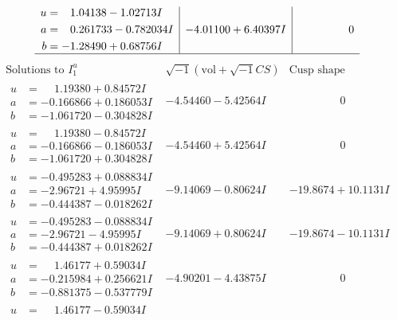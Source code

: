 \documentclass[1p]{elsarticle_modified}
\theoremstyle{definition}
\newcommand{\I}{\sqrt{-1}}
\begin{document}
$$\begin{array}{c|c|c}
\begin{aligned}
u &= \phantom{-}1.04138 - 1.02713 I \\
a &= \phantom{-}0.261733 - 0.782034 I \\
b &= -1.28490 + 0.68756 I\end{aligned}
 & -4.01100 + 6.40397 I & \phantom{-0.000000 } 0\\
 \hline 
 \end{array}$$\newpage$$\begin{array}{c|c|c}  
\text{Solutions to }I^u_{1}& \I (\text{vol} + \sqrt{-1}CS) & \text{Cusp shape}\\
 \hline 
\begin{aligned}
u &= \phantom{-}1.19380 + 0.84572 I \\
a &= -0.166866 + 0.186053 I \\
b &= -1.061720 - 0.304828 I\end{aligned}
 & -4.54460 - 5.42564 I & \phantom{-0.000000 } 0 \\ \hline\begin{aligned}
u &= \phantom{-}1.19380 - 0.84572 I \\
a &= -0.166866 - 0.186053 I \\
b &= -1.061720 + 0.304828 I\end{aligned}
 & -4.54460 + 5.42564 I & \phantom{-0.000000 } 0 \\ \hline\begin{aligned}
u &= -0.495283 + 0.088834 I \\
a &= -2.96721 + 4.95995 I \\
b &= -0.444387 - 0.018262 I\end{aligned}
 & -9.14069 - 0.80624 I & -19.8674 + 10.1131 I \\ \hline\begin{aligned}
u &= -0.495283 - 0.088834 I \\
a &= -2.96721 - 4.95995 I \\
b &= -0.444387 + 0.018262 I\end{aligned}
 & -9.14069 + 0.80624 I & -19.8674 - 10.1131 I \\ \hline\begin{aligned}
u &= \phantom{-}1.46177 + 0.59034 I \\
a &= -0.215984 + 0.256621 I \\
b &= -0.881375 - 0.537779 I\end{aligned}
 & -4.90201 - 4.43875 I & \phantom{-0.000000 } 0 \\ \hline\begin{aligned}
u &= \phantom{-}1.46177 - 0.59034 I \\

\end{aligned}
\end{array}$$
\end{document}
